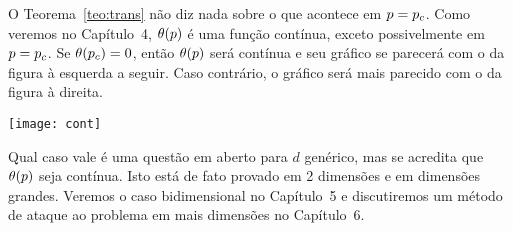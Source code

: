 O Teorema~\ref{teo:trans} não diz nada sobre o que acontece em $p=p_c$.
Como veremos no Capítulo~4, $\theta(p)$ é uma função contínua, exceto possivelmente
em $p=p_c$. Se $\theta(p_c)=0$, então $\theta(p)$ será contínua e seu gráfico se
parecerá com o da figura à esquerda a seguir.
Caso contrário, o gráfico será mais parecido com o da figura à direita.

\vs
%
\texttt{[image: cont]}

Qual caso vale é uma questão em aberto para $d$ genérico, mas se acredita que $\theta(p)$ seja
contínua. Isto está de fato provado em 2 dimensões e em dimensões grandes.
Veremos o caso bidimensional no Capítulo~5 e discutiremos um método de
ataque ao problema em mais dimensões no Capítulo~6.


